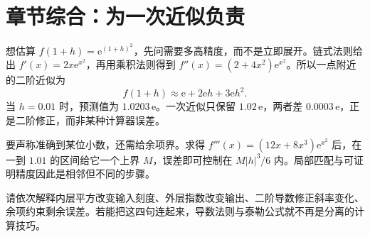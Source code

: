 \section*{章节综合：为一次近似负责}
想估算 $f(1+h)=\mathrm e^{(1+h)^2}$，先问需要多高精度，而不是立即展开。链式法则给出 $f'(x)=2x\mathrm e^{x^2}$，再用乘积法则得到 $f''(x)=(2+4x^2)\mathrm e^{x^2}$。所以一点附近的二阶近似为
\[f(1+h)\approx \mathrm e+2\mathrm e h+3\mathrm e h^2.\]
当 $h=0.01$ 时，预测值为 $1.0203\,\mathrm e$。一次近似只保留 $1.02\,\mathrm e$，两者差 $0.0003\,\mathrm e$，正是二阶修正，而非某种计算器误差。

要声称准确到某位小数，还需给余项界。求得 $f'''(x)=(12x+8x^3)\mathrm e^{x^2}$ 后，在一到 $1.01$ 的区间给它一个上界 $M$，误差即可控制在 $M|h|^3/6$ 内。局部匹配与可证明精度因此是相邻但不同的步骤。

请依次解释内层平方改变输入刻度、外层指数改变输出、二阶导数修正斜率变化、余项约束剩余误差。若能把这四句连起来，导数法则与泰勒公式就不再是分离的计算技巧。

